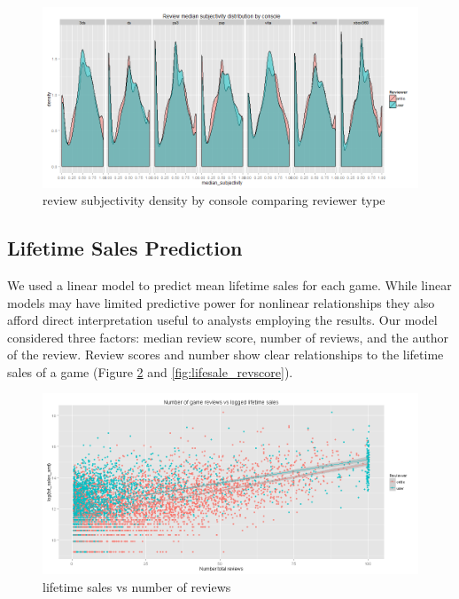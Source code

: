 \documentclass[letterpaper]{article}
\begin{document}
\begin{figure}[tbph]
\centering
\includegraphics[width=\linewidth]{./review_subjectivity}
\caption{review subjectivity density by console comparing reviewer type}
\label{fig:revpol_subjectivity}
\end{figure}

\subsection{Lifetime Sales Prediction}
We used a linear model to predict mean lifetime sales for each game. While linear models may have limited predictive power for nonlinear relationships they also afford direct interpretation useful to analysts employing the results. Our model considered three factors: median review score, number of reviews, and the author of the review. Review scores and number show clear relationships to the lifetime sales of a game (Figure \ref{fig:lifesale_revnum} and \ref{fig:lifesale_revscore}).

\begin{figure}[tbph]
\centering
\includegraphics[width=\linewidth]{./sales_total_vs_reviewnum}
\caption{lifetime sales vs number of reviews}
\label{fig:lifesale_revnum}
\end{figure}
\end{document}
